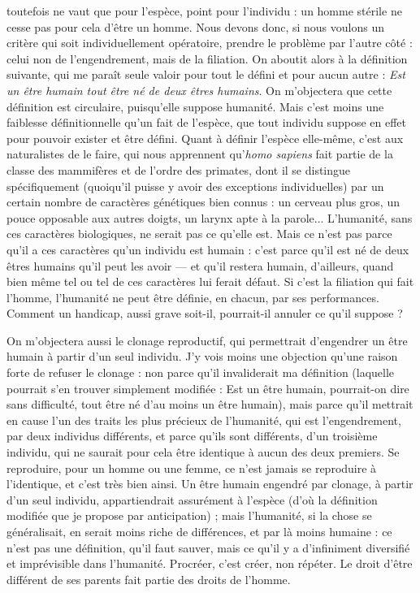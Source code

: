 toutefois ne vaut que pour l'espèce, point pour l’individu : un homme stérile
ne cesse pas pour cela d’être un homme. Nous devons donc, si nous voulons un
critère qui soit individuellement opératoire, prendre le problème par l’autre
côté : celui non de l’engendrement, mais de la filiation. On aboutit alors à la
définition suivante, qui me paraît seule valoir pour tout le défini et pour aucun
autre : {\it Est un être humain tout être né de deux êtres humains}. On m’objectera
que cette définition est circulaire, puisqu’elle suppose humanité. Mais c’est
moins une faiblesse définitionnelle qu’un fait de l'espèce, que tout individu
suppose en effet pour pouvoir exister et être défini. Quant à définir l'espèce
elle-même, c’est aux naturalistes de le faire, qui nous apprennent qu’{\it homo
sapiens} fait partie de la classe des mammifères et de l’ordre des primates, dont il
se distingue spécifiquement (quoiqu'il puisse y avoir des exceptions individuelles)
par un certain nombre de caractères génétiques bien connus : un cerveau
plus gros, un pouce opposable aux autres doigts, un larynx apte à la
parole... L’humanité, sans ces caractères biologiques, ne serait pas ce qu’elle
est. Mais ce n’est pas parce qu’il a ces caractères qu’un individu est humain :
c’est parce qu’il est né de deux êtres humains qu’il peut les avoir — et qu’il restera
humain, d’ailleurs, quand bien même tel ou tel de ces caractères lui ferait
défaut. Si c’est la filiation qui fait l’homme, l’humanité ne peut être définie, en
chacun, par ses performances. Comment un handicap, aussi grave soit-il, pourrait-il
annuler ce qu’il suppose ?

On m'objectera aussi le clonage reproductif, qui permettrait d’engendrer
un être humain à partir d’un seul individu. J’y vois moins une objection qu’une
raison forte de refuser le clonage : non parce qu’il invaliderait ma définition
(laquelle pourrait s’en trouver simplement modifiée : Est un être humain,
pourrait-on dire sans difficulté, tout être né d’au moins un être humain), mais
parce qu’il mettrait en cause l’un des traits les plus précieux de l'humanité, qui
est l’engendrement, par deux individus différents, et parce qu’ils sont différents,
d’un troisième individu, qui ne saurait pour cela être identique à aucun
des deux premiers. Se reproduire, pour un homme ou une femme, ce n’est
jamais se reproduire à l'identique, et c’est très bien ainsi. Un être humain
engendré par clonage, à partir d’un seul individu, appartiendrait assurément à
l'espèce (d’où la définition modifiée que je propose par anticipation) ; mais
l’humanité, si la chose se généralisait, en serait moins riche de différences, et
par là moins humaine : ce n’est pas une définition, qu’il faut sauver, mais ce
qu'il y a d’infiniment diversifié et imprévisible dans l'humanité. Procréer, c’est
créer, non répéter. Le droit d’être différent de ses parents fait partie des droits
de l’homme.


